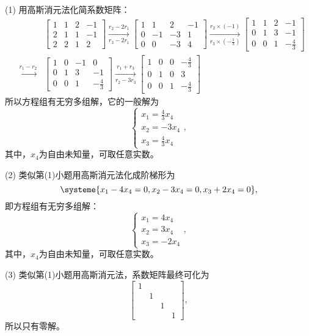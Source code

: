 \documentclass[a4paper]{book}
\newcommand{\enum}{\begin{list}{}{\setlength{\leftmargin}{0pt} \setlength{\itemindent}{2.5em} \setlength{\listparindent}{2em}}}
\begin{document}
\enum
\item[(1)] 用高斯消元法化简系数矩阵：
\begin{eqnarray*}
& & \begin{bmatrix} 1 & 1 & 2 & -1 \\ 2 & 1 & 1 & -1 \\ 2 & 2 & 1 & 2 \end{bmatrix} \xrightarrow[r_3-2r_1]{r_2-2r_1} \begin{bmatrix} 1 & 1 & 2 & -1 \\ 0 & -1 & -3 & 1 \\ 0 & 0 & -3 & 4 \end{bmatrix} \xrightarrow[r_3\times(-\frac13)]{r_2\times(-1)} \begin{bmatrix} 1 & 1 & 2 & -1 \\ 0 & 1 & 3 & -1 \\ 0 & 0 & 1 & -\frac43 \end{bmatrix} \\
& \xrightarrow{r_1-r_2} & \begin{bmatrix} 1 & 0 & -1 & 0 \\ 0 & 1 & 3 & -1 \\ 0 & 0 & 1 & -\frac43 \end{bmatrix} \xrightarrow[r_2-3r_3]{r_1+r_3} \begin{bmatrix} 1 & 0 & 0 & -\frac43 \\ 0 & 1 & 0 & 3 \\ 0 & 0 & 1 & -\frac43 \end{bmatrix}
\end{eqnarray*}
所以方程组有无穷多组解，它的一般解为
$$\begin{cases} x_1 = \frac43 x_4 \\ x_2 = -3x_4 \\ x_3 = \frac43 x_4 \end{cases},$$
其中，$x_4$为自由未知量，可取任意实数。

\item[(2)] 类似第(1)小题用高斯消元法化成阶梯形为
$$\systeme{ x_1 - 4x_4 = 0 , x_2 - 3x_4 = 0 , x_3 + 2x_4 = 0 },$$
即方程组有无穷多组解：
$$\begin{cases} x_1 = 4x_4 \\ x_2 = 3x_4 \\ x_3 = -2x_4 \end{cases},$$
其中，$x_4$为自由未知量，可取任意实数。

\item[(3)] 类似第(1)小题用高斯消元法，系数矩阵最终可化为
$$\begin{bmatrix}
1 & & & \\ & 1 & & \\ & & 1 & \\ & & & 1
\end{bmatrix},$$
所以只有零解。
\end{list}
\end{document}
